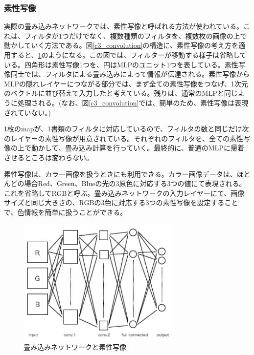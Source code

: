 \subsubsection{素性写像}
実際の畳み込みネットワークでは、素性写像と呼ばれる方法が使われている。これは、フィルタが1つだけでなく、複数種類のフィルタを、複数枚の画像の上で動かしていく方法である。図\ref{c3_convolution}の構造に、素性写像の考え方を適用すると、\ref{c3_feature_map}のようになる。この図では、フィルターが移動する様子は省略している。四角形は素性写像1つを、円はMLPのユニット1つを表している。素性写像同士では、フィルタによる畳み込みによって情報が伝達される。素性写像からMLPの隠れレイヤーにつながる部分では、まず全ての素性写像をつなげ、1次元のベクトルに並び替えて入力したと考えている。残りは、通常のMLPと同じように処理される。(なお、図\ref{c3_convolution}では、簡単のため、素性写像は表現されていない。)\par
1枚のmapが、1書類のフィルタに対応しているので、フィルタの数と同じだけ次のレイヤーの素性写像が用意されている。それぞれのフィルタを、全ての素性写像の上で動かして、畳み込み計算を行っていく。最終的に、普通のMLPに帰着させるところは変わらない。\par
素性写像は、カラー画像を扱うときにも利用できる。カラー画像データは、ほとんどの場合Red、Green、Blueの光の3原色に対応する3つの値にて表現される。これを省略してRGBと呼ぶ。畳み込みネットワークの入力レイヤーにて、画像サイズと同じ大きさの、RGBの3色に対応する3つの素性写像を設定することで、色情報を簡単に扱うことができる。

\begin{figure}[tbp]
 \centering
  \includegraphics[width=80mm]{img/c3/feature_map}
 \caption{畳み込みネットワークと素性写像}
 \label{c3_feature_map}
\end{figure}

